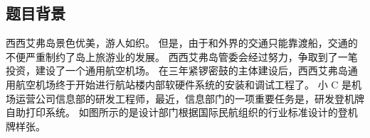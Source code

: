 \subsection*{题目背景}

西西艾弗岛景色优美，游人如织。
但是，由于和外界的交通只能靠渡船，交通的不便严重制约了岛上旅游业的发展。
西西艾弗岛管委会经过努力，争取到了一笔投资，建设了一个通用航空机场。
在三年紧锣密鼓的主体建设后，西西艾弗岛通用航空机场终于开始进行航站楼内部软硬件系统的安装和调试工程了。
小 C 是机场运营公司信息部的研发工程师，最近，信息部门的一项重要任务是，研发登机牌自助打印系统。
如图所示的是设计部门根据国际民航组织的行业标准设计的登机牌样张。

